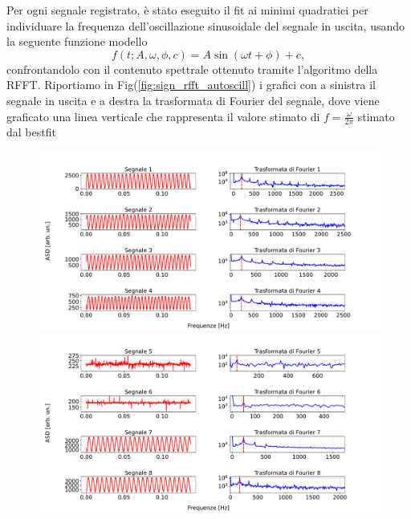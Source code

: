 \documentclass{article}
\begin{document}
    Per ogni segnale registrato, è stato eseguito il fit ai minimi quadratici per individuare la frequenza dell'oscillazione sinusoidale del segnale in uscita, usando la seguente funzione modello
        $$
            f(t; A, \omega, \phi, c) = A \sin{(\omega t + \phi)} + c,
        $$
    confrontandolo con il contenuto spettrale ottenuto tramite l'algoritmo della RFFT.
    Riportiamo in Fig(\ref{fig:sign_rfft_autoscill}) i grafici con a sinistra il segnale in uscita e a destra la trasformata di Fourier del segnale, dove viene graficato una linea verticale che rappresenta il valore stimato di $f = \frac{\omega}{2 \pi}$ stimato dal bestfit
        \begin{figure}[H]
            \centering
            \includegraphics[scale=0.4]{FFT11/first_graph.pdf}
            \includegraphics[scale=0.4]{FFT11/second_graph.pdf}
        \end{figure}
\end{document}
